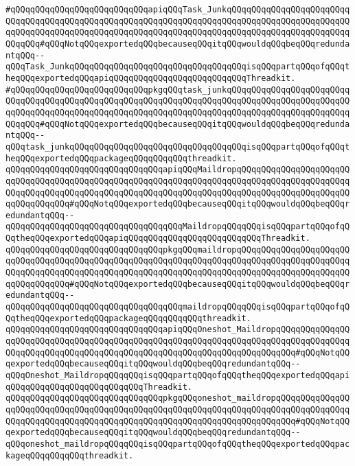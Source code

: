 \newline
\verb|#qQQqqQQqqQQqqQQqqQQqqQQqqQQqapiqQQqTask_JunkqQQqqQQqqQQqqQQqqQQqqQQqqQQqqQQqqQQqqQQqqQQqqQQqqQQqqQQqqQQqqQQqqQQqqQQqqQQqqQQqqQQqqQQqqQQqqQQqqQQqqQQqqQQqqQQqqQQqqQQqqQQqqQQqqQQqqQQqqQQqqQQqqQQqqQQqqQQqqQQqqQQqqQQqqQQq#qQQqNotqQQqexportedqQQqbecauseqQQqitqQQqwouldqQQqbeqQQqredundantqQQq--qQQqTask_JunkqQQqqQQqqQQqqQQqqQQqqQQqqQQqqQQqqQQqisqQQqpartqQQqofqQQqtheqQQqexportedqQQqapiqQQqqQQqqQQqqQQqqQQqqQQqqQQqThreadkit.|\newline
\verb|#qQQqqQQqqQQqqQQqqQQqqQQqqQQqpkgqQQqtask_junkqQQqqQQqqQQqqQQqqQQqqQQqqQQqqQQqqQQqqQQqqQQqqQQqqQQqqQQqqQQqqQQqqQQqqQQqqQQqqQQqqQQqqQQqqQQqqQQqqQQqqQQqqQQqqQQqqQQqqQQqqQQqqQQqqQQqqQQqqQQqqQQqqQQqqQQqqQQqqQQqqQQqqQQqqQQq#qQQqNotqQQqexportedqQQqbecauseqQQqitqQQqwouldqQQqbeqQQqredundantqQQq--qQQqtask_junkqQQqqQQqqQQqqQQqqQQqqQQqqQQqqQQqqQQqisqQQqpartqQQqofqQQqtheqQQqexportedqQQqpackageqQQqqQQqqQQqthreadkit.|\newline
\newline
\verb|qQQqqQQqqQQqqQQqqQQqqQQqqQQqqQQqapiqQQqMaildropqQQqqQQqqQQqqQQqqQQqqQQqqQQqqQQqqQQqqQQqqQQqqQQqqQQqqQQqqQQqqQQqqQQqqQQqqQQqqQQqqQQqqQQqqQQqqQQqqQQqqQQqqQQqqQQqqQQqqQQqqQQqqQQqqQQqqQQqqQQqqQQqqQQqqQQqqQQqqQQqqQQqqQQqqQQqqQQq#qQQqNotqQQqexportedqQQqbecauseqQQqitqQQqwouldqQQqbeqQQqredundantqQQq--qQQqqQQqqQQqqQQqqQQqqQQqqQQqqQQqqQQqMaildropqQQqqQQqisqQQqpartqQQqofqQQqtheqQQqexportedqQQqapiqQQqqQQqqQQqqQQqqQQqqQQqqQQqThreadkit.|\newline
\verb|qQQqqQQqqQQqqQQqqQQqqQQqqQQqqQQqpkgqQQqmaildropqQQqqQQqqQQqqQQqqQQqqQQqqQQqqQQqqQQqqQQqqQQqqQQqqQQqqQQqqQQqqQQqqQQqqQQqqQQqqQQqqQQqqQQqqQQqqQQqqQQqqQQqqQQqqQQqqQQqqQQqqQQqqQQqqQQqqQQqqQQqqQQqqQQqqQQqqQQqqQQqqQQqqQQqqQQqqQQq#qQQqNotqQQqexportedqQQqbecauseqQQqitqQQqwouldqQQqbeqQQqredundantqQQq--qQQqqQQqqQQqqQQqqQQqqQQqqQQqqQQqqQQqmaildropqQQqqQQqisqQQqpartqQQqofqQQqtheqQQqexportedqQQqpackageqQQqqQQqqQQqthreadkit.|\newline
\newline
\verb|qQQqqQQqqQQqqQQqqQQqqQQqqQQqqQQqapiqQQqOneshot_MaildropqQQqqQQqqQQqqQQqqQQqqQQqqQQqqQQqqQQqqQQqqQQqqQQqqQQqqQQqqQQqqQQqqQQqqQQqqQQqqQQqqQQqqQQqqQQqqQQqqQQqqQQqqQQqqQQqqQQqqQQqqQQqqQQqqQQqqQQqqQQqqQQq#qQQqNotqQQqexportedqQQqbecauseqQQqitqQQqwouldqQQqbeqQQqredundantqQQq--qQQqOneshot_MaildropqQQqqQQqisqQQqpartqQQqofqQQqtheqQQqexportedqQQqapiqQQqqQQqqQQqqQQqqQQqqQQqqQQqThreadkit.|\newline
\verb|qQQqqQQqqQQqqQQqqQQqqQQqqQQqqQQqpkgqQQqoneshot_maildropqQQqqQQqqQQqqQQqqQQqqQQqqQQqqQQqqQQqqQQqqQQqqQQqqQQqqQQqqQQqqQQqqQQqqQQqqQQqqQQqqQQqqQQqqQQqqQQqqQQqqQQqqQQqqQQqqQQqqQQqqQQqqQQqqQQqqQQqqQQqqQQq#qQQqNotqQQqexportedqQQqbecauseqQQqitqQQqwouldqQQqbeqQQqredundantqQQq--qQQqoneshot_maildropqQQqqQQqisqQQqpartqQQqofqQQqtheqQQqexportedqQQqpackageqQQqqQQqqQQqthreadkit.|\newline
